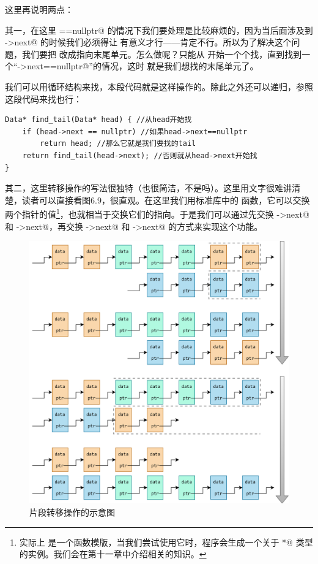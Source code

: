 这里再说明两点：\par
其一，在这里 \lstinline@tail==nullptr@ 的情况下我们要处理是比较麻烦的，因为当后面涉及到 \lstinline@tail->next@ 的时候我们必须得让 \lstinline@tail@ 有意义才行——\lstinline@nullptr@ 肯定不行。所以为了解决这个问题，我们要把 \lstinline@tail@ 改成指向末尾单元。怎么做呢？只能从 \lstinline@head@ 开始一个个找，直到找到一个``\lstinline@tail->next==nullptr@''的情况，这时 \lstinline@tail@ 就是我们想找的末尾单元了。\par
我们可以用循环结构来找，本段代码就是这样操作的。除此之外还可以递归，参照这段代码来找也行：
\begin{lstlisting}
Data* find_tail(Data* head) { //从head开始找
    if (head->next == nullptr) //如果head->next==nullptr
        return head; //那么它就是我们要找的tail
    return find_tail(head->next); //否则就从head->next开始找
}
\end{lstlisting}\par
其二，这里转移操作的写法很独特（也很简洁，不是吗）。这里用文字很难讲清楚，读者可以直接看图6.9，很直观。在这里我们用标准库中的 \lstinline@swap@ 函数，它可以交换两个指针的值\footnote{实际上 \lstinline@swap@ 是一个函数模版，当我们尝试使用它时，程序会生成一个关于 \lstinline@Data*@ 类型的实例。我们会在第十一章中介绍相关的知识。}，也就相当于交换它们的指向。于是我们可以通过先交换 \lstinline@tail->next@ 和 \lstinline@dest->next@，再交换 \lstinline@head->next@ 和 \lstinline@dest->next@ 的方式来实现这个功能。\par
\begin{figure}
    \centering
    \includegraphics[width=\textwidth]{../images/generalized_parts/06_range_transfer_between_lists_300.png}
    \caption{片段转移操作的示意图}
\end{figure}
